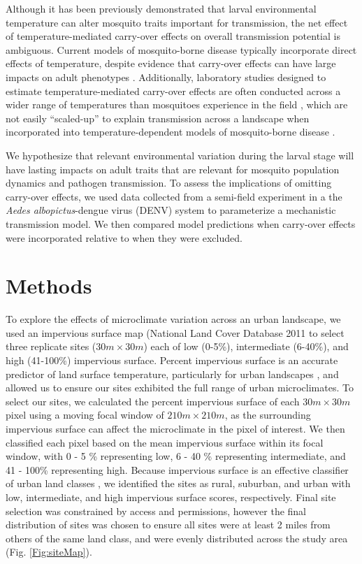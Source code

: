 \documentclass{bmcart}
\begin{document}
Although it has been previously demonstrated that larval environmental temperature can alter mosquito traits important for transmission, the net effect of temperature-mediated carry-over effects on overall transmission potential is ambiguous.
Current models of mosquito-borne disease typically incorporate direct effects of temperature, despite evidence that carry-over effects can have large impacts on adult phenotypes \citep{muturi2011c, muturi2011a, price2015}.
Additionally, laboratory studies designed to estimate temperature-mediated carry-over effects are often conducted across a wider range of temperatures than mosquitoes experience in the field \citep{cator2013}, which are not easily ``scaled-up'' to explain transmission across a landscape when incorporated into temperature-dependent models of mosquito-borne disease \citep{reiner2013}.

We hypothesize that relevant environmental variation during the larval stage will have lasting impacts on adult traits that are relevant for mosquito population dynamics and pathogen transmission.
To assess the implications of omitting carry-over effects, we used data collected from a semi-field experiment in a the \textit{Aedes albopictus}-dengue virus (DENV) system to parameterize a mechanistic transmission model.
We then compared model predictions when carry-over effects were incorporated relative to when they were excluded.

\section*{Methods}

To explore the effects of microclimate variation across an urban landscape, we used an impervious surface map (National Land Cover Database 2011 \citep{xian2011} to select three replicate sites ($30m \times 30m$) each of low (0-5\%), intermediate (6-40\%), and high (41-100\%) impervious surface. Percent impervious surface is an accurate predictor of land surface temperature, particularly for urban landscapes \citep{yuan2007}, and allowed us to ensure our sites exhibited the full range of urban microclimates. To select our sites, we calculated the percent impervious surface of each $30m \times 30m$ pixel using a moving focal window of $210m \times 210m$, as the surrounding impervious surface can affect the microclimate in the pixel of interest. We then classified each pixel based on the mean impervious surface within its focal window, with 0 - 5 \% representing low, 6 - 40 \% representing intermediate, and 41 - 100\% representing high. Because impervious surface is an effective classifier of urban land classes \citep{lu2006}, we identified the sites as rural, suburban, and urban with low, intermediate, and high impervious surface scores, respectively. Final site selection was constrained by access and permissions, however the final distribution of sites was chosen to ensure all sites were at least 2 miles from others of the same land class, and were evenly distributed across the study area (Fig. \ref{Fig:siteMap}).
\end{document}
